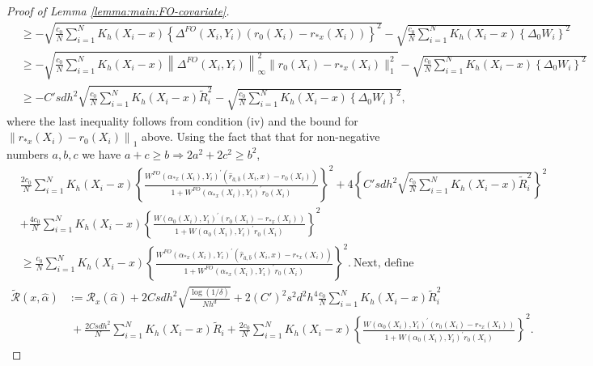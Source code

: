 \documentclass[11pt]{article}
\begin{document}
\begin{proof}[Proof of Lemma \ref{lemma:main:FO-covariate}]
$$\begin{array}{rl}
&\displaystyle \geq - \sqrt{\frac{c_0}{N} \sum_{i=1}^NK_h(X_i-x)\left\{\Delta^{FO}(X_i,Y_i)(r_0(X_i)-r_{*x}(X_i))\right\}^2} - \sqrt{\frac{c_0}{N} \sum_{i=1}^NK_h(X_i-x)\left\{\Delta_0W_i\right\}^2}   \\
&\displaystyle \geq - \sqrt{\frac{c_0}{N} \sum_{i=1}^NK_h(X_i-x)\left\|\Delta^{FO}(X_i,Y_i)\right\|_\infty^2\|r_0(X_i)-r_{*x}(X_i)\|^2_1}-\sqrt{\frac{c_0}{N} \sum_{i=1}^NK_h(X_i-x)\left\{\Delta_0W_i\right\}^2}   \\
&\displaystyle \geq -C'sdh^2\sqrt{\frac{c_0}{N} \sum_{i=1}^NK_h(X_i-x) \widetilde{R}_i^2} - \sqrt{\frac{c_0}{N} \sum_{i=1}^NK_h(X_i-x)\left\{\Delta_0W_i\right\}^2},   
\end{array}$$ 
where the last inequality follows from condition (iv) and the bound for $\left\|  r_{*x}(X_i)-r_0(X_i) \right\|_1$ above. Using the fact that that for non-negative numbers $a, b, c$ we have $a+c\geq b\Rightarrow 2a^2+2c^2\geq b^2$, 
$$\begin{array}{rl}
&\displaystyle\frac{2c_0}{N}\!\!\sum_{i=1}^N\!K_h(X_i-x)\!\!\left\{\!\frac{W^{FO}(\alpha_{*x}(X_i),Y_i)^\prime(\hat{r}_{\hat a, \hat b}(X_i,x)-r_0(X_i))}{1+W^{FO}(\alpha_{*x}(X_i),Y_i)^\prime r_0(X_i)}\right\}^2 \!\!\!\!\!+\!\! 4\!\left\{\!C'sdh^2\sqrt{\frac{c_0}{N} \sum_{i=1}^NK_h(X_i-x) \widetilde{R}_i^2}\right\}^2\\
&\displaystyle + \frac{4c_0}{N} \sum_{i=1}^NK_h(X_i-x)\left\{\frac{W(\alpha_0(X_i),Y_i)^\prime(r_0(X_i)-r_{*x}(X_i))}{1+W(\alpha_0(X_i),Y_i)^\prime r_0(X_i)}\right\}^2 \\
&\displaystyle \geq\frac{c_0}{N} \sum_{i=1}^NK_h(X_i-x)\left\{\frac{W^{FO}(\alpha_{*x}(X_i),Y_i)^\prime(\hat{r}_{\hat a, \hat b}(X_i,x)-r_{*x}(X_i))}{1+W^{FO}(\alpha_{*x}(X_i),Y_i)^\prime r_0(X_i)}\right\}^2.\ \mbox{Next, define }
\end{array}$$
$$\begin{array}{rl}
\widetilde{\mathcal{R}}(x,\hat{\alpha})&\displaystyle:= \mathcal{R}_x(\hat\alpha)  + 2Csdh^2\sqrt{\frac{\log(1/\delta)}{Nh^d}}+2(C')^2s^2d^2h^4\frac{c_0}{N} \sum_{i=1}^NK_h(X_i-x)\widetilde{R}_i^2\\
&\displaystyle \ +  \frac{2Csdh^2}{N}\sum_{i=1}^N K_h(X_i-x)\widetilde{R}_i+\frac{2c_0}{N} \sum_{i=1}^NK_h(X_i-x)\left\{\frac{W(\alpha_0(X_i),Y_i)^\prime(r_0(X_i)-r_{*x}(X_i))}{1+W(\alpha_0(X_i),Y_i)^\prime r_0(X_i)}\right\}^2.
\end{array}$$

\end{proof}
\end{document}
